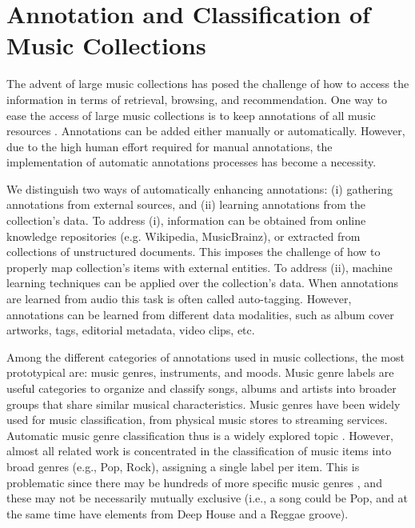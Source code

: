 \section{Annotation and Classification of Music Collections}
\label{sec:intro:annotation}

The advent of large music collections has posed the challenge of how to access the information in terms of retrieval, browsing, and recommendation. One way to ease the access of large music collections is to keep annotations of all music resources \citep{sordo2012semantic}. Annotations can be added either manually or automatically. 
However, due to the high human effort required for manual annotations, the implementation of automatic annotations processes has become a necessity. 

We distinguish two ways of automatically enhancing annotations: (i) gathering annotations from external sources, and (ii) learning annotations from the collection's data. To address (i), information can be obtained from online knowledge repositories (e.g. Wikipedia, MusicBrainz), or extracted from collections of unstructured documents. This imposes the challenge of how to properly map collection's items with external entities. To address (ii), machine learning techniques can be applied over the collection's data. When annotations are learned from audio this task is often called auto-tagging. However, annotations can be learned from different data modalities, such as album cover artworks, tags, editorial metadata, video clips, etc.

Among the different categories of annotations used in music collections, the most prototypical are: music genres, instruments, and moods. 
Music genre labels are useful categories to organize and classify songs, albums and artists into broader groups that share similar musical characteristics. Music genres have been widely used for music classification, from physical music stores to streaming services. Automatic music genre classification thus is a widely explored topic \citep{sturm2012survey}.
However, almost all related work is concentrated in the classification of music items into broad genres (e.g., Pop, Rock), assigning a single label per item. This is problematic since there may be hundreds of more specific music genres \citep{pachet2000taxonomy}, and these may not be necessarily mutually exclusive (i.e., a song could be Pop, and at the same time have elements from Deep House and a Reggae groove). 

